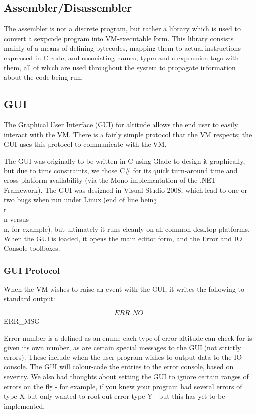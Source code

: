 \documentclass[10pt,a4paper]{report}
\begin{document}
\subsection{Assembler/Disassembler}
The assembler is not a discrete program, but rather a library which is used to convert a sexpcode program into VM-executable form. This library consists mainly of a means of defining bytecodes, mapping them to actual instructions expressed in C code, and associating names, types and s-expression tags with them, all of which are used throughout the system to propagate information about the code being run.

\subsection{GUI}
The Graphical User Interface (GUI) for altitude allows the end user to easily interact with the VM. There is a fairly simple protocol that the VM respects; the GUI uses this protocol to communicate with the VM.

The GUI was originally to be written in C using Glade to design it graphically, but due to time constraints, we chose C# for its quick turn-around time and cross platform availability (via the Mono implementation of the .NET Framework). The GUI was designed in Visual Studio 2008, which lead to one or two bugs when run under Linux (end of line being \\r\\n versus \\n, for example), but ultimately it runs cleanly on all common desktop platforms. When the GUI is loaded, it opens the main editor form, and the Error and IO Console toolboxes.

\subsubsection{GUI Protocol}
When the VM wishes to raise an event with the GUI, it writes the following to standard output:

\[ERR\_NO\] ERR\_MSG

Error number is a defined as an enum; each type of error altitude can check for is given its own number, as are certain special messages to the GUI (not strictly errors). These include when the user program wishes to output data to the IO console. The GUI will colour-code the entries to the error console, based on severity. We also had thoughts about setting the GUI to ignore certain ranges of errors on the fly -  for example, if you knew your program had several errors of type X but only wanted to root out error type Y - but this has yet to be implemented.
\end{document}
